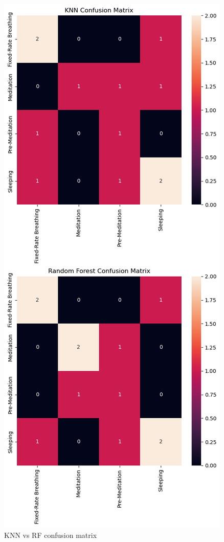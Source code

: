 \documentclass[
  11pt,
]{ieee}
\begin{document}
\begin{figure}

{\centering \includegraphics{picture_use_ml/10_Confusion Matrices_KNN vs Random Forest.png}

}

\caption{KNN vs RF confusion matrix}

\end{figure}%
\end{document}

